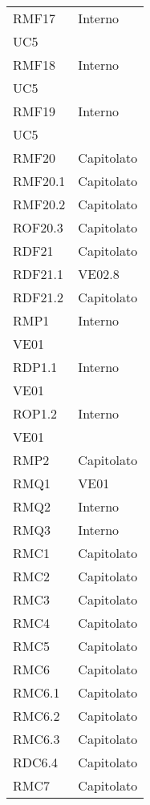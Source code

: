 \begin{longtable}[h!] { >{\centering}m{5cm} >{\centering}m{5cm} }
	\tabularnewline
	RMF17 & Interno\\UC5
	\tabularnewline
	RMF18 & Interno\\UC5
	\tabularnewline
	RMF19 & Interno\\UC5
	\tabularnewline
	RMF20 & Capitolato
	\tabularnewline
	RMF20.1 & Capitolato
	\tabularnewline
	RMF20.2 & Capitolato
	\tabularnewline
	ROF20.3 & Capitolato
	\tabularnewline
	RDF21 & Capitolato
	\tabularnewline
	RDF21.1 & VE02.8
	\tabularnewline
	RDF21.2 & Capitolato
	\tabularnewline
	RMP1 & Interno\\VE01
	\tabularnewline
	RDP1.1 & Interno\\VE01
	\tabularnewline
	ROP1.2 & Interno\\VE01
	\tabularnewline
	RMP2 & Capitolato
	\tabularnewline
	RMQ1 & VE01
	\tabularnewline
	RMQ2 & Interno
	\tabularnewline
	RMQ3 & Interno
	\tabularnewline
	RMC1 & Capitolato
	\tabularnewline
	RMC2 & Capitolato
	\tabularnewline
	RMC3 & Capitolato
	\tabularnewline
	RMC4 & Capitolato
	\tabularnewline
	RMC5 & Capitolato
	\tabularnewline
	RMC6 & Capitolato
	\tabularnewline
	RMC6.1 & Capitolato
	\tabularnewline
	RMC6.2 & Capitolato
	\tabularnewline
	RMC6.3 & Capitolato
	\tabularnewline
	RDC6.4 & Capitolato
	\tabularnewline
	RMC7 & Capitolato
	\tabularnewline
	
\end{longtable}

